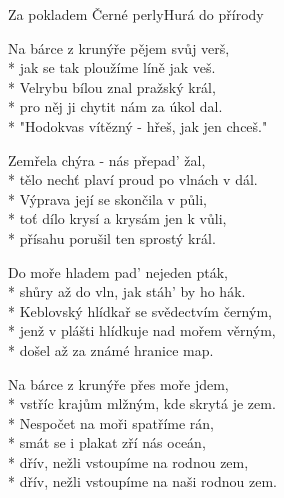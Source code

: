 \documentclass[10.5pt]{book}
\begin{document}
\newpage
\thispagestyle{empty}


\begin{poem}{Za pokladem Černé perly}{Hurá do přírody}

\settowidth{\versewidth}{"Hodokvas vítězný - hřeš, jak jen chceš."}

Na bárce z krunýře pějem svůj verš,\\*
jak se tak ploužíme líně jak veš.\\*
Velrybu bílou znal pražský král,\\*
pro něj ji chytit nám za úkol dal.\\*
"Hodokvas vítězný - hřeš, jak jen chceš."

Zemřela chýra - nás přepad' žal, \\*
tělo nechť plaví proud po vlnách v dál.\\*
Výprava její se skončila v půli,\\*
toť dílo krysí a krysám jen k vůli,\\*
přísahu porušil ten sprostý král.

Do moře hladem pad' nejeden pták,\\*
shůry až do vln, jak stáh' by ho hák.\\*
Keblovský hlídkař se svědectvím černým,\\*
jenž v plášti hlídkuje nad mořem věrným,\\*
došel až za známé hranice map.

Na bárce z krunýře přes moře jdem, \\*
vstříc krajům mlžným, kde skrytá je zem.\\*
Nespočet na moři spatříme rán,\\*
smát se i plakat zří nás oceán,\\*
dřív, nežli vstoupíme na rodnou zem,\\*
dřív, nežli vstoupíme na naši rodnou zem.

\end{poem}
\end{document}
